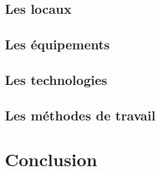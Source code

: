         \subsection{Les locaux}
        \paragraph{}
        \subsection{Les équipements}
        \paragraph{}
        \subsection{Les technologies}
        \paragraph{}
        \subsection{Les méthodes de travail}
        \paragraph{}

\section*{Conclusion}
\paragraph{}
\lipsum[1]